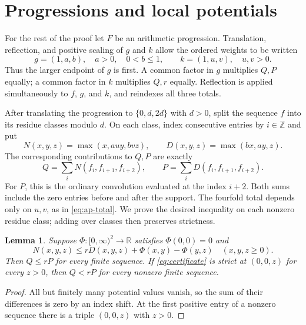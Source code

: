 \documentclass[11pt,a4paper]{article}
\newtheorem{lemma}[theorem]{Lemma}
\theoremstyle{remark}
\newcommand{\Z}{\mathbb Z}
\begin{document}
\section{Progressions and local potentials}\label{sec:ap}

For the rest of the proof let $F$ be an arithmetic progression.
Translation, reflection, and positive scaling of $g$ and $k$ allow the
ordered weights to be written
\begin{equation}\label{eq:normalization}
 g=(1,a,b),\quad a>0,\quad0<b\le1,
 \qquad k=(1,u,v),\quad u,v>0.
\end{equation}
Thus the larger endpoint of $g$ is first. A common factor in $g$
multiplies $Q,P$ equally; a common factor in $k$ multiplies $Q,r$
equally. Reflection is applied simultaneously to $f$, $g$, and $k$,
and reindexes all three totals.

After translating the progression to $\{0,d,2d\}$ with $d>0$, split
the sequence $f$ into its residue classes modulo $d$. On each class,
index consecutive entries by $i\in\Z$ and put
\begin{equation}\label{eq:ND}
 N(x,y,z)=\max(x,auy,bvz),\qquad D(x,y,z)=\max(bx,ay,z).
\end{equation}
The corresponding contributions to $Q,P$ are exactly
\begin{equation}\label{eq:triples}
 Q=\sum_i N(f_i,f_{i+1},f_{i+2}),\qquad
 P=\sum_i D(f_i,f_{i+1},f_{i+2}).
\end{equation}
For $P$, this is the ordinary convolution evaluated at the index $i+2$.
Both sums include the zero entries before and after the support.
The fourfold total depends only on $u,v$, as in \eqref{eq:ap-total}.
We prove the desired inequality on each nonzero residue class; adding
over classes then preserves strictness.

\begin{lemma}\label{lem:telescoping}
Suppose $\Phi:[0,\infty)^2\to\mathbb R$ satisfies $\Phi(0,0)=0$ and
\begin{equation}\label{eq:certificate}
 N(x,y,z)\le rD(x,y,z)+\Phi(x,y)-\Phi(y,z)
 \quad(x,y,z\ge0).
\end{equation}
Then $Q\le rP$ for every finite sequence. If \eqref{eq:certificate}
is strict at $(0,0,z)$ for every $z>0$, then $Q<rP$ for every
nonzero finite sequence.
\end{lemma}

\begin{proof}
All but finitely many potential values vanish, so the sum of their
differences is zero by an index shift. At the first positive entry
of a nonzero sequence there is a triple $(0,0,z)$ with $z>0$.
\end{proof}
\end{document}
